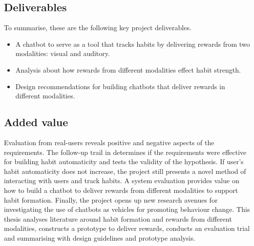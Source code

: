 \newpage
\subsection*{Deliverables}
To summarise, these are the following key project deliverables.

\begin{itemize}
  \item A chatbot to serve as a tool that tracks habits by delivering rewards from two modalities: visual and auditory.
  \item Analysis about how rewards from different modalities effect habit strength.
  \item Design recommendations for building chatbots that deliver rewards in different modalities.
\end{itemize}

\subsection*{Added value}
Evaluation from real-users reveals positive and negative aspects of the requirements. The follow-up trail in determines if the requirements were effective for building habit automaticity and tests the validity of the hypothesis. If user's habit automaticity does not increase, the project still presents a novel method of interacting with users and track habits. A system evaluation provides value on how to build a chatbot to deliver rewards from different modalities to support habit formation. Finally, the project opens up new research avenues for investigating the use of chatbots as vehicles for promoting behaviour change.\newline
\newline
This thesis analyses literature around habit formation and rewards from different modalities, constructs a prototype to deliver rewards, conducts an evaluation trial and summarising with design guidelines and prototype analysis.

\newpage
